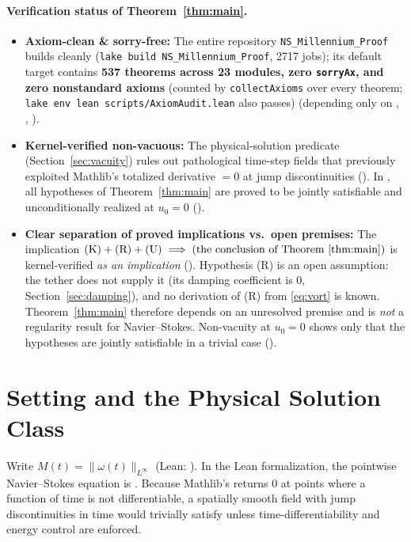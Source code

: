 \documentclass[11pt,a4paper]{article}
\theoremstyle{plain}
\theoremstyle{definition}
\theoremstyle{remark}
\begin{document}
\paragraph{Verification status of Theorem~\ref{thm:main}.}
\begin{itemize}
\item \textbf{Axiom-clean \& sorry-free:} The entire repository \texttt{NS\_Millennium\_Proof} builds cleanly (\texttt{lake build NS\_Millennium\_Proof}, 2717 jobs); its default target contains \textbf{537 theorems across 23 modules, zero \texttt{sorryAx}, and zero nonstandard axioms} (counted by \texttt{collectAxioms} over every theorem; \texttt{lake env lean scripts/AxiomAudit.lean} also passes) (depending only on , , ).
\item \textbf{Kernel-verified non-vacuous:} The physical-solution predicate  (Section~\ref{sec:vacuity}) rules out pathological time-step fields that previously exploited Mathlib's totalized derivative  $=0$ at jump discontinuities (). In , all hypotheses of Theorem~\ref{thm:main} are proved to be jointly satisfiable and unconditionally realized at $u_0=0$ ().
\item \textbf{Clear separation of proved implications vs.\ open premises:} The implication $\text{(K)}+\text{(R)}+\text{(U)}\implies\text{(the conclusion of Theorem~\ref{thm:main})}$ is kernel-verified \emph{as an implication} (). Hypothesis (R) is an open assumption: the tether does not supply it (its damping coefficient is $0$, Section~\ref{sec:damping}), and no derivation of (R) from \eqref{eq:vort} is known. Theorem~\ref{thm:main} therefore depends on an unresolved premise and is \emph{not} a regularity result for Navier--Stokes. Non-vacuity at $u_0=0$ shows only that the hypotheses are jointly satisfiable in a trivial case ().
\end{itemize}

\section{Setting and the Physical Solution Class}\label{sec:setting}

Write $M(t)=\|\omega(t)\|_{L^\infty}$ (Lean: ). In the Lean formalization, the pointwise Navier--Stokes equation is . Because Mathlib's  returns $0$ at points where a function of time is not differentiable, a spatially smooth field with jump discontinuities in time would trivially satisfy  unless time-differentiability and energy control are enforced.
\end{document}
